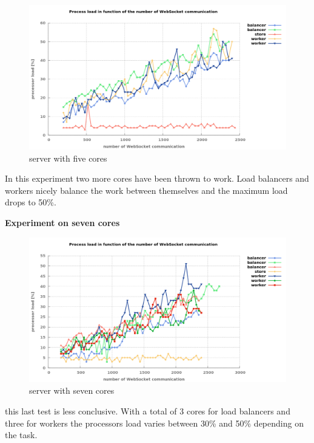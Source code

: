\begin{figure}[H]
	\centering
		\includegraphics[width=\textwidth]{./Figures/WS_server_2rising.png}
	\caption[WebSocket server on five cores]{server with five cores}
	\label{fig:WS_server_2rising}
\end{figure}

In this experiment two more cores have been thrown to work. Load balancers and
workers nicely balance the work between themselves and the maximum load drops to 50\%.

\textbf{Experiment on seven cores}

\begin{figure}[H]
	\centering
		\includegraphics[width=\textwidth]{./Figures/WS_server_3rising.png}
	\caption[WebSocket server on seven cores]{server with seven cores}
	\label{fig:WS_server_3rising}
\end{figure}

this last test is less conclusive. With a total of 3 cores for load balancers
and three for workers the processors load varies between 30\% and 50\%
depending on the task.\\

